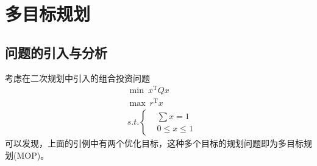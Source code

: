 % 
\chapter{多目标规划}
\section{问题的引入与分析}
    考虑在二次规划中引入的组合投资问题
    \begin{align*}
    &\mathop {\min}\  x^\mathrm{T} Qx\\
    &\mathop {\max}\  r^\mathrm{T} x\\
    &s.t.\left\{
    \begin{aligned}
    &\mathop {\sum} x=1\\
    &0 \leqslant x \leqslant 1
    \end{aligned}
    \right.
    \end{align*}
    可以发现，上面的引例中有两个优化目标，这种多个目标的规划问题即为多目标规划(MOP)。
